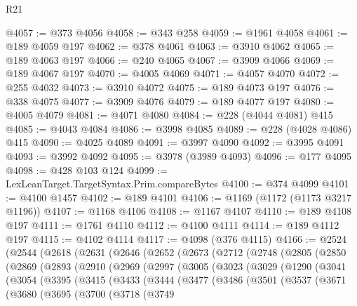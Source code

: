 \begin{lexlean}{R21}
\begin{coremodule}
@4057 := @373 @4056
@4058 := @343 @258
@4059 := @1961 @4058
@4061 := @189 @4059 @197
@4062 := @378 @4061
@4063 := @3910 @4062
@4065 := @189 @4063 @197
@4066 := @240 @4065
@4067 := @3909 @4066
@4069 := @189 @4067 @197
@4070 := @4005 @4069
@4071 := @4057 @4070
@4072 := @255 @4032
@4073 := @3910 @4072
@4075 := @189 @4073 @197
@4076 := @338 @4075
@4077 := @3909 @4076
@4079 := @189 @4077 @197
@4080 := @4005 @4079
@4081 := @4071 @4080
@4084 := @228 (@4044 @4081) @415
@4085 := @4043 @4084
@4086 := @3998 @4085
@4089 := @228 (@4028 @4086) @415
@4090 := @4025 @4089
@4091 := @3997 @4090
@4092 := @3995 @4091
@4093 := @3992 @4092
@4095 := @3978 (@3989 @4093)
@4096 := @177 @4095
@4098 := @428 @103 @124
@4099 := LexLeanTarget.TargetSyntax.Prim.compareBytes
@4100 := @374 @4099
@4101 := @4100 @1457
@4102 := @189 @4101
@4106 := @1169 (@1172 (@1173 @3217 @1196))
@4107 := @1168 @4106
@4108 := @1167 @4107
@4110 := @189 @4108 @197
@4111 := @1761 @4110
@4112 := @4100 @4111
@4114 := @189 @4112 @197
@4115 := @4102 @4114
@4117 := @4098 (@376 @4115)
@4166 := @2524
    (@2544
      (@2618
        (@2631
          (@2646
            (@2652
              (@2673
                (@2712
                  (@2748
                    (@2805
                      (@2850
                        (@2869
                          (@2893
                            (@2910
                              (@2969
                                (@2997
                                  (@3005
                                    (@3023
                                      (@3029
                                        (@1290
                                          (@3041
                                            (@3054
                                              (@3395
                                                (@3415
                                                  (@3433
                                                    (@3444
                                                      (@3477
                                                        (@3486
                                                          (@3501
                                                            (@3537
                                                              (@3671
                                                                (@3680
                                                                  (@3695
                                                                    (@3700
                                                                      (@3718
                                                                        (@3749

\end{coremodule}
\end{lexlean}
